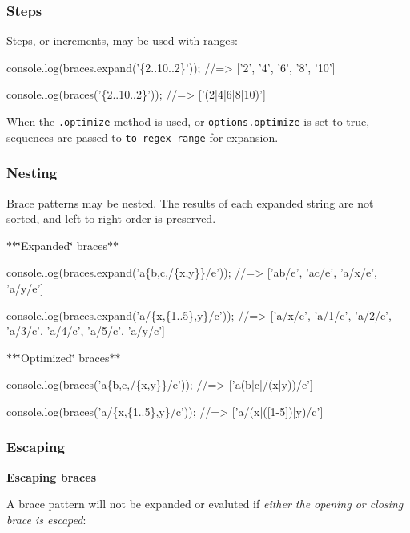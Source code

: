 \subsubsection*{Steps}

Steps, or increments, may be used with ranges\+:


\begin{DoxyCode}
console.log(braces.expand('\{2..10..2\}'));
//=> ['2', '4', '6', '8', '10']

console.log(braces('\{2..10..2\}'));
//=> ['(2|4|6|8|10)']
\end{DoxyCode}


When the \href{#optimize}{\tt .optimize} method is used, or \href{#optionsoptimize}{\tt options.\+optimize} is set to true, sequences are passed to \href{https://github.com/jonschlinkert/to-regex-range}{\tt to-\/regex-\/range} for expansion.

\subsubsection*{Nesting}

Brace patterns may be nested. The results of each expanded string are not sorted, and left to right order is preserved.

$\ast$$\ast$\char`\"{}\+Expanded\char`\"{} braces$\ast$$\ast$


\begin{DoxyCode}
console.log(braces.expand('a\{b,c,/\{x,y\}\}/e'));
//=> ['ab/e', 'ac/e', 'a/x/e', 'a/y/e']

console.log(braces.expand('a/\{x,\{1..5\},y\}/c'));
//=> ['a/x/c', 'a/1/c', 'a/2/c', 'a/3/c', 'a/4/c', 'a/5/c', 'a/y/c']
\end{DoxyCode}


$\ast$$\ast$\char`\"{}\+Optimized\char`\"{} braces$\ast$$\ast$


\begin{DoxyCode}
console.log(braces('a\{b,c,/\{x,y\}\}/e'));
//=> ['a(b|c|/(x|y))/e']

console.log(braces('a/\{x,\{1..5\},y\}/c'));
//=> ['a/(x|([1-5])|y)/c']
\end{DoxyCode}


\subsubsection*{Escaping}

{\bfseries Escaping braces}

A brace pattern will not be expanded or evaluted if {\itshape either the opening or closing brace is escaped}\+:


